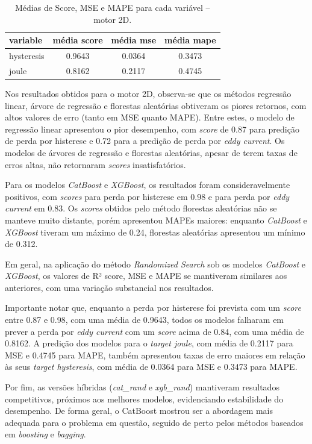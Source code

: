 \documentclass{article}
\begin{document}
\begin{table}[!htbp]
\centering
\caption{Médias de Score, MSE e MAPE para cada variável \--- motor 2D.}
\begin{tabular}{lccc}
\hline
\textbf{variable} & \textbf{média score} & \textbf{média mse} & \textbf{média mape} \\
\hline
hysteresis & 0.9643 & 0.0364 & 0.3473 \\
joule      & 0.8162 & 0.2117 & 0.4745 \\
\hline
\end{tabular}
\label{tab:medias_variaveis_2D}
\end{table}


Nos resultados obtidos para o motor 2D, observa-se que os métodos regressão linear, árvore de regressão e florestas aleatórias obtiveram os piores retornos, com altos valores de erro (tanto em MSE quanto MAPE). Entre estes, o modelo de regressão linear apresentou o pior desempenho, com \textit{score} de 0.87 para predição de perda por histerese e 0.72 para a predição de perda por \textit{eddy current}. Os modelos de árvores de regressão e florestas aleatórias, apesar de terem taxas de erros altas, não retornaram \textit{scores} insatisfatórios.

Para os modelos \textit{CatBoost} e \textit{XGBoost}, os resultados foram consideravelmente positivos, com \textit{scores} para perda por histerese em 0.98 e para perda por \textit{eddy current} em 0.83. Os \textit{scores} obtidos pelo método florestas aleatórias não se manteve muito distante, porém apresentou MAPEs maiores: enquanto \textit{CatBoost} e \textit{XGBoost} tiveram um máximo de 0.24, florestas aleatórias apresentou um mínimo de 0.312.

Em geral, na aplicação do método \textit{Randomized Search} sob os modelos \textit{CatBoost} e \textit{XGBoost}, os valores de R² score, MSE e MAPE se mantiveram similares aos anteriores, com uma variação substancial nos resultados.

Importante notar que, enquanto a perda por histerese foi prevista com um \textit{score} entre 0.87 e 0.98, com uma média de 0.9643, todos os modelos falharam em prever a perda por \textit{eddy current} com um \textit{score} acima de 0.84, com uma média de 0.8162. A predição dos modelos para o \textit{target joule}, com média de 0.2117 para MSE e 0.4745 para MAPE, também apresentou taxas de erro maiores em relação às seus \textit{target hysteresis}, com média de 0.0364 para MSE e 0.3473 para MAPE.

Por fim, as versões híbridas (\textit{cat\_rand} e \textit{xgb\_rand}) mantiveram resultados competitivos, próximos aos melhores modelos, evidenciando estabilidade do desempenho. De forma geral, o CatBoost mostrou ser a abordagem mais adequada para o problema em questão, seguido de perto pelos métodos baseados em \textit{boosting} e \textit{bagging}.
\end{document}

